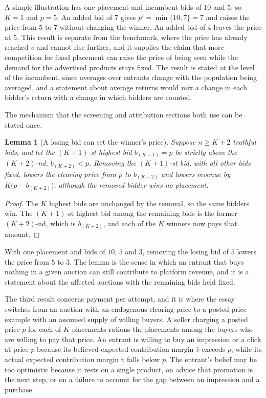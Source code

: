 \documentclass[11pt]{article}
\newtheorem{lemma}{Lemma}
\theoremstyle{definition}
\begin{document}
A simple illustration has one placement and incumbent bids of $10$ and $5$, so $K=1$ and $p=5$. An added bid of $7$ gives $p'=\min\{10,7\}=7$ and raises the price from $5$ to $7$ without changing the winner. An added bid of $4$ leaves the price at $5$. This result is separate from the benchmark, where the price has already reached $v$ and cannot rise further, and it supplies the claim that more competition for fixed placement can raise the price of being seen while the demand for the advertised products stays fixed. The result is stated at the level of the incumbent, since averages over entrants change with the population being averaged, and a statement about average returns would mix a change in each bidder's return with a change in which bidders are counted.

The mechanism that the screening and attribution sections both use can be stated once.

\begin{lemma}[A losing bid can set the winner's price]\label{lem:losing}
Suppose $n\ge K+2$ truthful bids, and let the $(K+1)$-st highest bid $b_{(K+1)}=p$ be strictly above the $(K+2)$-nd, $b_{(K+2)}<p$. Removing the $(K+1)$-st bid, with all other bids fixed, lowers the clearing price from $p$ to $b_{(K+2)}$ and lowers revenue by $K\bigl(p-b_{(K+2)}\bigr)$, although the removed bidder wins no placement.
\end{lemma}

\begin{proof}
The $K$ highest bids are unchanged by the removal, so the same bidders win. The $(K+1)$-st highest bid among the remaining bids is the former $(K+2)$-nd, which is $b_{(K+2)}$, and each of the $K$ winners now pays that amount.
\end{proof}

With one placement and bids of $10$, $5$ and $3$, removing the losing bid of $5$ lowers the price from $5$ to $3$. The lemma is the sense in which an entrant that buys nothing in a given auction can still contribute to platform revenue, and it is a statement about the affected auctions with the remaining bids held fixed.

The third result concerns payment per attempt, and it is where the essay switches from an auction with an endogenous clearing price to a posted-price example with an assumed supply of willing buyers. A seller charging a posted price $p$ for each of $K$ placements rations the placements among the buyers who are willing to pay that price. An entrant is willing to buy an impression or a click at price $p$ because its believed expected contribution margin $\hat v$ exceeds $p$, while its actual expected contribution margin $v$ falls below $p$. The entrant's belief may be too optimistic because it rests on a single product, on advice that promotion is the next step, or on a failure to account for the gap between an impression and a purchase.
\end{document}
